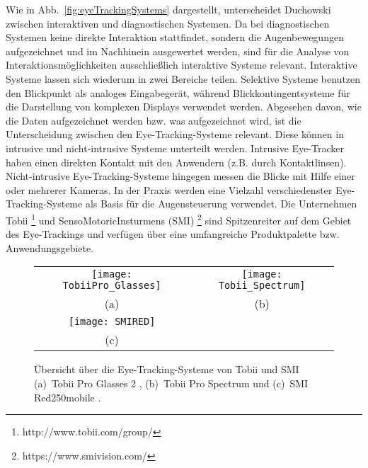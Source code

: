 Wie in Abb.~\ref{fig:eyeTrackingSystems} dargestellt, unterscheidet Duchowski \cite{Duchowski} zwischen interaktiven und diagnostischen Systemen. Da bei diagnostischen Systemen keine direkte Interaktion stattfindet, sondern die Augenbewegungen aufgezeichnet und im Nachhinein ausgewertet werden, sind für die Analyse von Interaktionsmöglichkeiten ausschließlich interaktive Systeme relevant. 
\newline \newline
Interaktive Systeme lassen sich wiederum in zwei Bereiche teilen. Selektive Systeme benutzen den Blickpunkt als analoges Eingabegerät, während Blickkontingentsysteme für die Darstellung von komplexen Displays verwendet werden. 
\newline \newline
Abgesehen davon, wie die Daten aufgezeichnet werden bzw. was aufgezeichnet wird, ist die Unterscheidung zwischen den Eye-Tracking-Systeme relevant. Diese können in intrusive und nicht-intrusive Systeme unterteilt werden. Intrusive Eye-Tracker haben einen direkten Kontakt mit den Anwendern (z.B. durch Kontaktlinsen). Nicht-intrusive Eye-Tracking-Systeme hingegen messen die Blicke mit Hilfe einer oder mehrerer Kameras. 
\newline \newline
In der Praxis werden eine Vielzahl verschiedenster Eye-Tracking-Systeme als Basis für die Augensteuerung verwendet. Die Unternehmen Tobii %
\footnote{http://www.tobii.com/group/}
%
und SensoMotoricInsturmens (SMI) %
\footnote{https://www.smivision.com/}
%
sind Spitzenreiter auf dem Gebiet des Eye-Trackings und verfügen über eine umfangreiche Produktpalette bzw. Anwendungsgebiete. 
\begin{figure}
\centering\small
\setlength{\tabcolsep}{0mm}	%
\begin{tabular}{c@{\hspace{-15mm}}c} %
  \texttt{[image: TobiiPro\_Glasses]} &
  \texttt{[image: Tobii\_Spectrum]}
\\
  (a) & (b)
\\[4pt]	%
  \texttt{[image: SMIRED]}
\\
  (c)
\end{tabular}
%
\caption{Übersicht über die Eye-Tracking-Systeme von Tobii und SMI \newline
(a)~Tobii Pro Glasses 2 \cite{TobiiGlasses}, (b)~Tobii Pro Spectrum \cite{TobiiSpectrum} und (c)~SMI Red250mobile \cite{SMIRED}.}
\label{fig:Tobii}
\end{figure}
